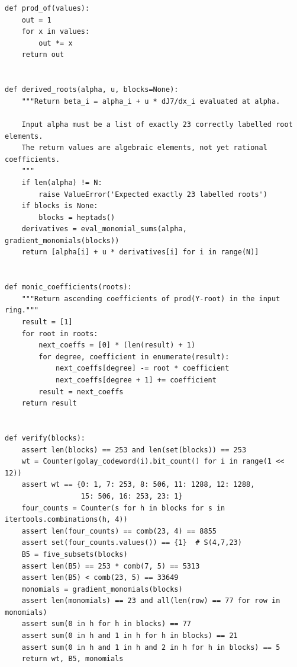 \documentclass[11pt,letterpaper]{article}
\theoremstyle{definition}
\begin{document}
\begin{lstlisting}[style=compactpy]
def prod_of(values):
    out = 1
    for x in values:
        out *= x
    return out


def derived_roots(alpha, u, blocks=None):
    """Return beta_i = alpha_i + u * dJ7/dx_i evaluated at alpha.

    Input alpha must be a list of exactly 23 correctly labelled root elements.
    The return values are algebraic elements, not yet rational coefficients.
    """
    if len(alpha) != N:
        raise ValueError('Expected exactly 23 labelled roots')
    if blocks is None:
        blocks = heptads()
    derivatives = eval_monomial_sums(alpha, gradient_monomials(blocks))
    return [alpha[i] + u * derivatives[i] for i in range(N)]


def monic_coefficients(roots):
    """Return ascending coefficients of prod(Y-root) in the input ring."""
    result = [1]
    for root in roots:
        next_coeffs = [0] * (len(result) + 1)
        for degree, coefficient in enumerate(result):
            next_coeffs[degree] -= root * coefficient
            next_coeffs[degree + 1] += coefficient
        result = next_coeffs
    return result


def verify(blocks):
    assert len(blocks) == 253 and len(set(blocks)) == 253
    wt = Counter(golay_codeword(i).bit_count() for i in range(1 << 12))
    assert wt == {0: 1, 7: 253, 8: 506, 11: 1288, 12: 1288,
                  15: 506, 16: 253, 23: 1}
    four_counts = Counter(s for h in blocks for s in itertools.combinations(h, 4))
    assert len(four_counts) == comb(23, 4) == 8855
    assert set(four_counts.values()) == {1}  # S(4,7,23)
    B5 = five_subsets(blocks)
    assert len(B5) == 253 * comb(7, 5) == 5313
    assert len(B5) < comb(23, 5) == 33649
    monomials = gradient_monomials(blocks)
    assert len(monomials) == 23 and all(len(row) == 77 for row in monomials)
    assert sum(0 in h for h in blocks) == 77
    assert sum(0 in h and 1 in h for h in blocks) == 21
    assert sum(0 in h and 1 in h and 2 in h for h in blocks) == 5
    return wt, B5, monomials



\end{lstlisting}
\end{document}
